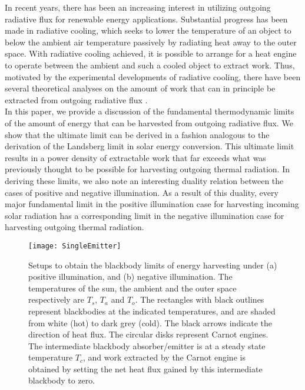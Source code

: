 \documentclass[notitlepage,onecolumn,aps,showpacs,preprintnumbers,amsmath,amssymb,superscriptaddress]{revtex4-1}
\begin{document}
In recent years, there has been an increasing interest in utilizing outgoing radiative flux for renewable energy applications. Substantial progress has been made in radiative cooling, which seeks to lower the temperature of an object to below the ambient air temperature passively \citep{catalanottiRC, berdahlRC, gentleRC, rephaeliRC, ramanRC, nanfangRC,  smithRC, hossainRC, chenRC, zhaiRC, minnichRC, goldsteinRC} by radiating heat away to the outer space. With radiative cooling achieved, it is possible to arrange for a heat engine to operate between the ambient and such a cooled object to extract work. Thus, motivated by the experimental developments of radiative cooling, there have been several theoretical analyses on the amount of work that can in principle be extracted from outgoing radiative flux \citep{berdahl, capasso, strandberg1, strandberg2, parthi, gangchen}. \\

In this paper, we provide a discussion of the fundamental thermodynamic limits of the amount of energy that can be harvested from outgoing radiative flux. We show that the ultimate limit can be derived in a fashion analogous to the derivation of the Landsberg limit in solar energy conversion. This ultimate limit results in a power density of extractable work that far exceeds what was previously thought to be possible for harvesting outgoing thermal radiation. In deriving these limits, we also note an interesting duality relation between the cases of positive and negative illumination. As a result of this duality, every major fundamental limit in the positive illumination case for harvesting incoming solar radiation has a corresponding limit in the negative illumination case for harvesting outgoing thermal radiation. \\

\begin{figure}
\centering
\texttt{[image: SingleEmitter]}
\caption{Setups to obtain the blackbody limits of energy harvesting under (a) positive illumination, and (b) negative illumination. The temperatures of the sun, the ambient and the outer space respectively are $T_s$, $T_a$ and $T_o$. The rectangles with black outlines represent blackbodies at the indicated temperatures, and are shaded from white (hot) to dark grey (cold). The black arrows indicate the direction of heat flux. The circular disks represent Carnot engines. The intermediate blackbody absorber/emitter is at a steady state temperature $T_c$, and work extracted by the Carnot engine is obtained by setting the net heat flux gained by this intermediate blackbody to zero.}
\label{SingleEmitterFigure}
\end{figure}
\end{document}
